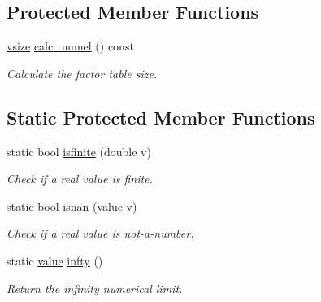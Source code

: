 \subsection*{Protected Member Functions}
\begin{DoxyCompactItemize}
\item 
\hyperlink{classmerlin_1_1factor_a31de8d8d0c43cc33dc3874408e75b0fc}{vsize} \hyperlink{classmerlin_1_1factor_abf5be29f8457f2f30d2c8d305cbbf193}{calc\+\_\+numel} () const 
\begin{DoxyCompactList}\small\item\em Calculate the factor table size. \end{DoxyCompactList}\end{DoxyCompactItemize}
\subsection*{Static Protected Member Functions}
\begin{DoxyCompactItemize}
\item 
static bool \hyperlink{classmerlin_1_1factor_ae4504c8e1fa22705efcbf6ffd077575d}{isfinite} (double v)\hypertarget{classmerlin_1_1factor_ae4504c8e1fa22705efcbf6ffd077575d}{}\label{classmerlin_1_1factor_ae4504c8e1fa22705efcbf6ffd077575d}

\begin{DoxyCompactList}\small\item\em Check if a real value is finite. \end{DoxyCompactList}\item 
static bool \hyperlink{classmerlin_1_1factor_a2a705124978c870c0233956610ff9f89}{isnan} (\hyperlink{classmerlin_1_1factor_a1b14d19e509403448fbef26b003c9281}{value} v)\hypertarget{classmerlin_1_1factor_a2a705124978c870c0233956610ff9f89}{}\label{classmerlin_1_1factor_a2a705124978c870c0233956610ff9f89}

\begin{DoxyCompactList}\small\item\em Check if a real value is not-\/a-\/number. \end{DoxyCompactList}\item 
static \hyperlink{classmerlin_1_1factor_a1b14d19e509403448fbef26b003c9281}{value} \hyperlink{classmerlin_1_1factor_a3f88d157c50bf2bb65dc04c535f4e344}{infty} ()\hypertarget{classmerlin_1_1factor_a3f88d157c50bf2bb65dc04c535f4e344}{}\label{classmerlin_1_1factor_a3f88d157c50bf2bb65dc04c535f4e344}

\begin{DoxyCompactList}\small\item\em Return the infinity numerical limit. \end{DoxyCompactList}\end{DoxyCompactItemize}
